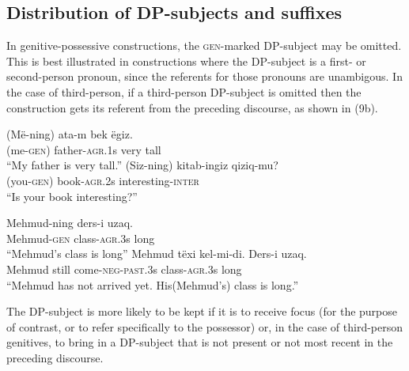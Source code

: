 \documentclass[letterpaper,12pt]{article}
\newcommand{\poss}[2]{\textsc{agr}.{\footnotesize #1}#2}
\newcommand{\gen}{\textsc{gen}}
\begin{document}
\subsection{Distribution of DP-subjects and suffixes}
In genitive-possessive constructions, the \gen-marked DP-subject may be omitted. This is best illustrated in constructions where the DP-subject is a first-
or second-person pronoun, since the referents for those pronouns are unambigous. In the case of third-person, if a third-person DP-subject is omitted then the 
construction gets its referent from the preceding discourse, as shown in (9b).
\begin{exe}
	\ex \gll (M\"e-ning) ata-m bek \"egiz.\\
					 (me-\gen{}) father-\poss{1}{s} very tall\\
			\glt ``My father is very tall.''
	\ex \gll (Siz-ning) kitab-ingiz qiziq-mu?\\
					 (you-\gen{}) book-\poss{2}{s} interesting-\textsc{inter}\\
			\glt ``Is your book interesting?''
\ex
	\begin{xlist}	
	\ex \gll Mehmud-ning ders-i uzaq.\\
					 Mehmud-\gen{} class-\poss{3}{s} long\\
			\glt ``Mehmud's class is long''
	\ex \gll Mehmud t\"exi kel-mi-di. Ders-i uzaq.\\
					Mehmud still come-\textsc{neg}-\textsc{past}.{\footnotesize 3}s class-\poss{3}{s} long\\
			\glt ``Mehmud has not arrived yet. His(Mehmud's) class is long.''
	\end{xlist}
\end{exe}
The DP-subject is more likely to be kept if it is to receive focus (for the purpose of contrast, or to refer
specifically to the possessor) or, in the case of third-person genitives, to bring in a DP-subject that is not present or not most recent in the preceding discourse.
\end{document}
